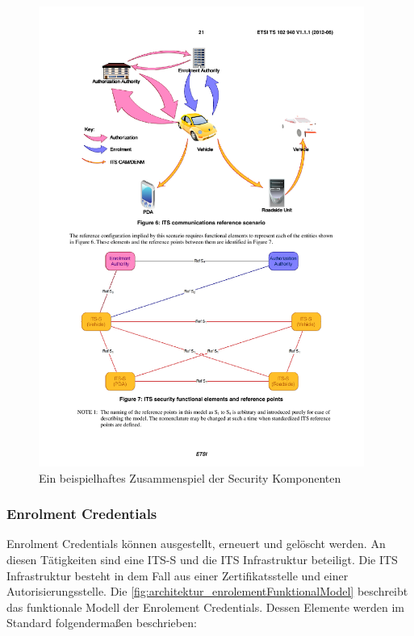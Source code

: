 \begin{figure}[h]
	\includegraphics[width=0.95\textwidth]{content/images/02_architektur/enrolementScenario-ts102_940.pdf}
	\caption{Ein beispielhaftes Zusammenspiel der Security Komponenten \cite{ts102940}}
	\label{fig:architektur_enrolementBeispielSzenario}
\end{figure}

\subsubsection{Enrolment Credentials}
Enrolment Credentials können ausgestellt, erneuert und gelöscht werden. An diesen Tätigkeiten sind eine \ac{ITS-S} und die \ac{ITS} Infrastruktur beteiligt. Die \ac{ITS} Infrastruktur besteht in dem Fall aus einer Zertifikatsstelle und einer Autorisierungsstelle. Die \autoref{fig:architektur_enrolementFunktionalModel} beschreibt das funktionale Modell der Enrolement Credentials. Dessen Elemente werden im Standard \cite{ts102731} folgendermaßen beschrieben:



